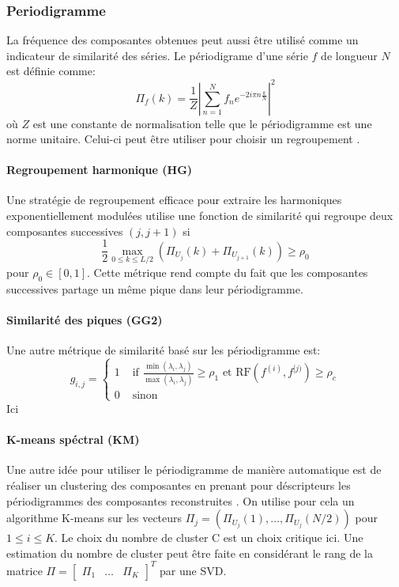 \documentclass{gretsi}
\begin{document}
\subsubsection{Periodigramme}

La fréquence des composantes obtenues peut aussi être utilisé comme un indicateur de similarité des séries. Le périodigrame d'une série $f$ de longueur $N$ est définie comme:$$
\Pi_f(k) = \frac{1}{Z}\left|\sum_{n=1}^N f_n e^{-2i\pi n \frac{k}{N}}\right|^2
$$ où $Z$ est une constante de normalisation telle que le périodigramme est une norme unitaire. Celui-ci peut être utiliser pour choisir un regroupement \cite{GNZ_10_SSA}.

\paragraph{Regroupement harmonique (HG)}\label{par:HG}
    Une stratégie de regroupement efficace pour extraire les harmoniques exponentiellement modulées \cite{alexandrov_05_auto} utilise une fonction de similarité qui regroupe deux composantes successives $(j, j+1)$ si 
    $$
    \frac{1}{2}\max_{0\le k \le L/2}\left(\Pi_{U_j}(k) + \Pi_{U_{j+1}}(k)\right) \ge \rho_0 
    $$pour $\rho_0\in \left[0, 1\right]$. Cette métrique rend compte du fait que les composantes successives partage un même pique dans leur périodigramme.


\paragraph{Similarité des piques (GG2)}\label{par:GG2}
    Une autre métrique de similarité basé sur les périodigramme est:
    $$
    g_{i, j} = \begin{cases}
	    1 & \text{ if } \displaystyle\frac{\min(\lambda_i, \lambda_j)}{\max(\lambda_i, \lambda_j)} \ge \rho_1 \text{ et } \text{RF}(f^{(i)}, f^{[j)}) \ge \rho_c\\
	    0 & \text{ sinon}
    \end{cases}
    $$Ici
\paragraph{K-means spéctral (KM)}\label{par:KM}
Une autre idée pour utiliser le périodigramme de manière automatique est de réaliser un clustering des composantes en prenant pour déscripteurs les périodigrammes des composantes reconstruites \cite{alvarez_2013_auto}. On utilise pour cela un algorithme K-means sur les vecteurs $\Pi_j = (\Pi_{U_j}(1), \dots, \Pi_{U_j}(N/2))$ pour $1 \le i \le K$. Le choix du nombre de cluster C est un choix critique ici. Une estimation du nombre de cluster peut être faite en considérant le rang de la matrice $\Pi = \begin{bmatrix}
	\Pi_1&\dots&\Pi_K
\end{bmatrix}^T$ par une SVD.
\end{document}
